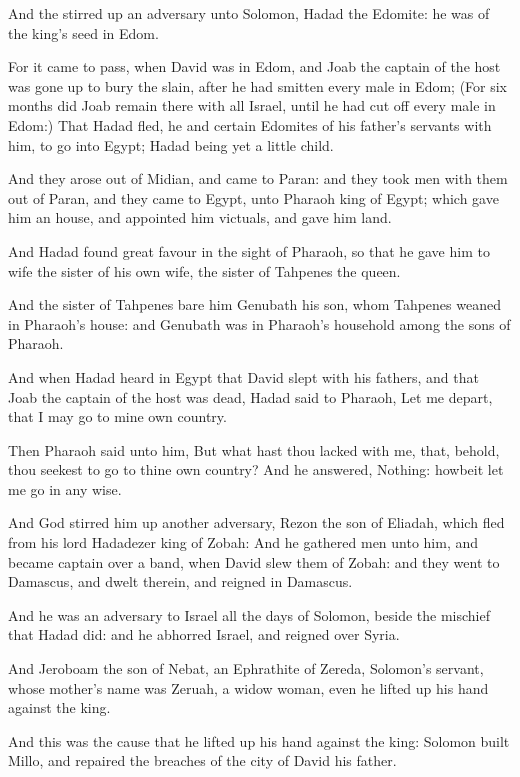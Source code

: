 \verse And the \LORD stirred up an adversary unto Solomon, Hadad the Edomite: he was of the king's seed in Edom.

\verse For it came to pass, when David was in Edom, and Joab the captain of the host was gone up to bury the slain, after he had smitten every male in Edom; \verse (For six months did Joab remain there with all Israel, until he had cut off every male in Edom:) \verse That Hadad fled, he and certain Edomites of his father's servants with him, to go into Egypt; Hadad being yet a little child.

\verse And they arose out of Midian, and came to Paran: and they took men with them out of Paran, and they came to Egypt, unto Pharaoh king of Egypt; which gave him an house, and appointed him victuals, and gave him land.

\verse And Hadad found great favour in the sight of Pharaoh, so that he gave him to wife the sister of his own wife, the sister of Tahpenes the queen.

\verse And the sister of Tahpenes bare him Genubath his son, whom Tahpenes weaned in Pharaoh's house: and Genubath was in Pharaoh's household among the sons of Pharaoh.

\verse And when Hadad heard in Egypt that David slept with his fathers, and that Joab the captain of the host was dead, Hadad said to Pharaoh, Let me depart, that I may go to mine own country.

\verse Then Pharaoh said unto him, But what hast thou lacked with me, that, behold, thou seekest to go to thine own country? And he answered, Nothing: howbeit let me go in any wise.

\verse And God stirred him up another adversary, Rezon the son of Eliadah, which fled from his lord Hadadezer king of Zobah: \verse And he gathered men unto him, and became captain over a band, when David slew them of Zobah: and they went to Damascus, and dwelt therein, and reigned in Damascus.

\verse And he was an adversary to Israel all the days of Solomon, beside the mischief that Hadad did: and he abhorred Israel, and reigned over Syria.

\verse And Jeroboam the son of Nebat, an Ephrathite of Zereda, Solomon's servant, whose mother's name was Zeruah, a widow woman, even he lifted up his hand against the king.

\verse And this was the cause that he lifted up his hand against the king: Solomon built Millo, and repaired the breaches of the city of David his father.

